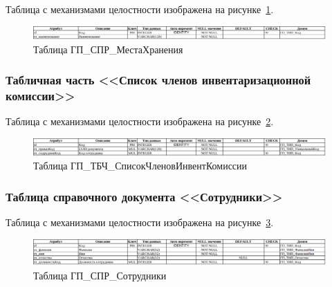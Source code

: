 Таблица с механизмами целостности изображена на рисунке~\ref{fig:Logic_DE_CTL_StorageLocations}.

\begin{figure}[!h]
    \centering

    \includegraphics[width=18cm]
    {assets/database/Types/ГП_СПР_МестаХранения.png}

    \caption{Таблица ГП\_СПР\_МестаХранения}

    \label{fig:Logic_DE_CTL_StorageLocations}
\end{figure}


\subsubsection*{Табличная часть <<Список членов инвентаризационной комиссии>>}

Таблица с механизмами целостности изображена на рисунке~\ref{fig:Logic_DE_TAB_ListInventoryCommission}.

\begin{figure}[!h]
    \centering

    \includegraphics[width=18cm]
    {assets/database/Types/ГП_ТБЧ_СписокЧленовИнвентКомиссии.png}

    \caption{Таблица ГП\_ТБЧ\_СписокЧленовИнвентКомиссии}

    \label{fig:Logic_DE_TAB_ListInventoryCommission}
\end{figure}


\subsubsection*{Таблица справочного документа <<Сотрудники>>}

Таблица с механизмами целостности изображена на рисунке~\ref{fig:Logic_DE_CTL_Employees}.

\begin{figure}[!h]
    \centering

    \includegraphics[width=18cm]
    {assets/database/Types/ГП_СПР_Сотрудники.png}

    \caption{Таблица ГП\_СПР\_Сотрудники}

    \label{fig:Logic_DE_CTL_Employees}
\end{figure}

